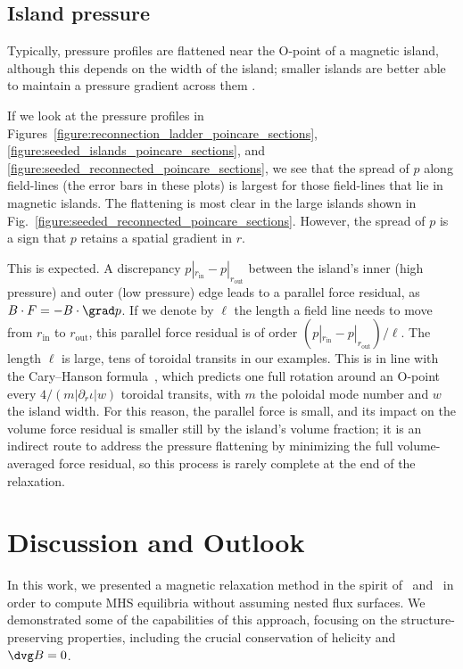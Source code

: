\documentclass[%
 reprint,
 superscriptaddress,
 amsmath,amssymb,
 aps, nofootinbib, floatfix]{revtex4-2}
\begin{document}
\subsection{Island pressure}
\label{sec:island_pressure}
Typically, pressure profiles are flattened near the O-point of a magnetic island, although this depends on the width of the island; smaller islands are better able to maintain a pressure gradient across them \cite{liu_pressure_2026}. 

If we look at the pressure profiles in Figures~\ref{figure:reconnection_ladder_poincare_sections}, \ref{figure:seeded_islands_poincare_sections}, and \ref{figure:seeded_reconnected_poincare_sections}, we see that the spread of $p$ along field-lines (the error bars in these plots) is largest for those field-lines that lie in magnetic islands. The flattening is most clear in the large islands shown in Fig.~\ref{figure:seeded_reconnected_poincare_sections}. However, the spread of $p$ is a sign that $p$ retains a spatial gradient in $r$.

This is expected. A discrepancy $p |_{r_\mathrm{in}} - p |_{r_\mathrm{out}}$ between the island's inner (high pressure) and outer (low pressure) edge leads to a parallel force residual, as $B \cdot F = - B \cdot \grad p$. If we denote by $\ell$ the length a field line needs to move from $r_\mathrm{in}$ to $r_\mathrm{out}$, this parallel force residual is of order $(p |_{r_\mathrm{in}} - p |_{r_\mathrm{out}}) / \ell$. The length $\ell$ is large, tens of toroidal transits in our examples. This is in line with the Cary--Hanson formula~\citep[Equations (44-45)]{cary_simple_1991}, which predicts one full rotation around an O-point every $4/(m|\partial_r \iota|w)$ toroidal transits, with $m$ the poloidal mode number and $w$ the island width. For this reason, the parallel force is small, and its impact on the volume force residual is smaller still by the island's volume fraction; it is an indirect route to address the pressure flattening by minimizing the full volume-averaged force residual, so this process is rarely complete at the end of the relaxation.

\section{Discussion and Outlook}
\label{sec:discussion}

In this work, we presented a magnetic relaxation method in the spirit of~\cite{chodura_3d_1981} and~\cite{hirshman_siesta_2011} in order to compute MHS equilibria without assuming nested flux surfaces. We demonstrated some of the capabilities of this approach, focusing on the structure-preserving properties, including the crucial conservation of helicity and $\dvg B = 0$.
\end{document}

